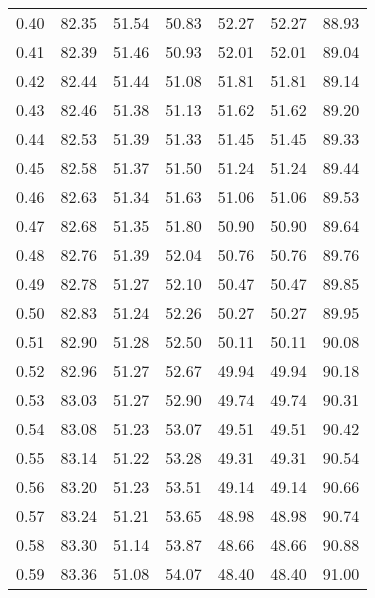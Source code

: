 \begin{tabular}{|c|c|c|c|c|c|c|}
      0.40 &     82.35 &     51.54 &      50.83 &   52.27 &      52.27 &         88.93 \\
      0.41 &     82.39 &     51.46 &      50.93 &   52.01 &      52.01 &         89.04 \\
      0.42 &     82.44 &     51.44 &      51.08 &   51.81 &      51.81 &         89.14 \\
      0.43 &     82.46 &     51.38 &      51.13 &   51.62 &      51.62 &         89.20 \\
      0.44 &     82.53 &     51.39 &      51.33 &   51.45 &      51.45 &         89.33 \\
      0.45 &     82.58 &     51.37 &      51.50 &   51.24 &      51.24 &         89.44 \\
      0.46 &     82.63 &     51.34 &      51.63 &   51.06 &      51.06 &         89.53 \\
      0.47 &     82.68 &     51.35 &      51.80 &   50.90 &      50.90 &         89.64 \\
      0.48 &     82.76 &     51.39 &      52.04 &   50.76 &      50.76 &         89.76 \\
      0.49 &     82.78 &     51.27 &      52.10 &   50.47 &      50.47 &         89.85 \\
      0.50 &     82.83 &     51.24 &      52.26 &   50.27 &      50.27 &         89.95 \\
      0.51 &     82.90 &     51.28 &      52.50 &   50.11 &      50.11 &         90.08 \\
      0.52 &     82.96 &     51.27 &      52.67 &   49.94 &      49.94 &         90.18 \\
      0.53 &     83.03 &     51.27 &      52.90 &   49.74 &      49.74 &         90.31 \\
      0.54 &     83.08 &     51.23 &      53.07 &   49.51 &      49.51 &         90.42 \\
      0.55 &     83.14 &     51.22 &      53.28 &   49.31 &      49.31 &         90.54 \\
      0.56 &     83.20 &     51.23 &      53.51 &   49.14 &      49.14 &         90.66 \\
      0.57 &     83.24 &     51.21 &      53.65 &   48.98 &      48.98 &         90.74 \\
      0.58 &     83.30 &     51.14 &      53.87 &   48.66 &      48.66 &         90.88 \\
      0.59 &     83.36 &     51.08 &      54.07 &   48.40 &      48.40 &         91.00 \\

\end{tabular}
